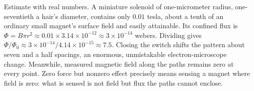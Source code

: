 \begin{center}
\end{center}

\begin{mainline}
Estimate with real numbers. A miniature solenoid of one-micrometer radius, one-seventieth a hair's diameter, contains only \(0.01\) tesla, about a tenth of an ordinary small magnet's surface field and easily attainable. Its confined flux is \(\Phi=B\pi r^{2}\approx0.01\times3.14\times10^{-12}\approx3\times10^{-14}\) webers. Dividing gives \(\Phi/\Phi_0\approx3\times10^{-14}/4.14\times10^{-15}\approx7.5\). Closing the switch shifts the pattern about seven and a half spacings, an enormous, unmistakable electron-microscope change. Meanwhile, measured magnetic field along the paths remains zero at every point. Zero force but nonzero effect precisely means sensing a magnet where field is zero: what is sensed is not field but flux the paths cannot enclose.
\end{mainline}

